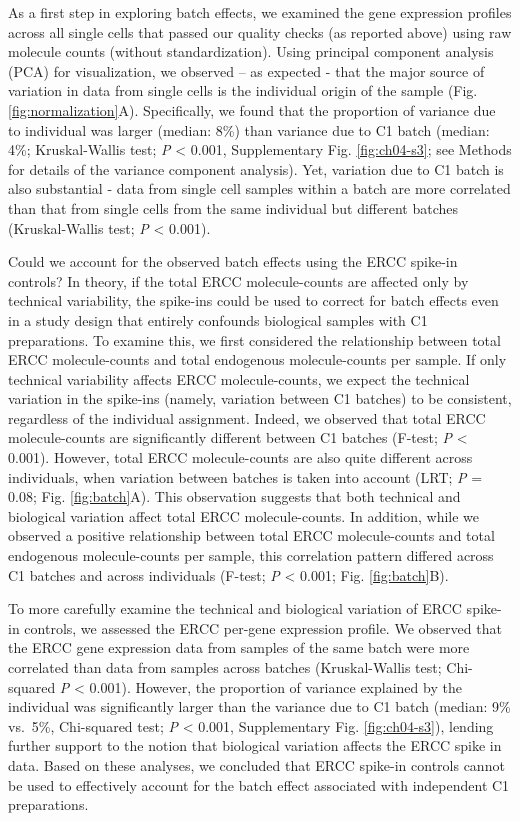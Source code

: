 As a first step in exploring batch effects, we examined the gene
expression profiles across all single cells that passed our quality
checks (as reported above) using raw molecule counts (without
standardization). Using principal component analysis (PCA) for
visualization, we observed -- as expected - that the major source of
variation in data from single cells is the individual origin of the
sample (Fig. \ref{fig:normalization}A). Specifically, we found that
the proportion of variance due to individual was larger (median: 8\%)
than variance due to C1 batch (median: 4\%; Kruskal-Wallis test;
\emph{P} \textless{} 0.001, Supplementary Fig. \ref{fig:ch04-s3}; see
Methods for details of the variance component analysis). Yet,
variation due to C1 batch is also substantial - data from single cell
samples within a batch are more correlated than that from single cells
from the same individual but different batches (Kruskal-Wallis test;
\emph{P} \textless{} 0.001).

Could we account for the observed batch effects using the ERCC
spike-in controls? In theory, if the total ERCC molecule-counts are
affected only by technical variability, the spike-ins could be used to
correct for batch effects even in a study design that entirely
confounds biological samples with C1 preparations. To examine this, we
first considered the relationship between total ERCC molecule-counts
and total endogenous molecule-counts per sample. If only technical
variability affects ERCC molecule-counts, we expect the technical
variation in the spike-ins (namely, variation between C1 batches) to
be consistent, regardless of the individual assignment. Indeed, we
observed that total ERCC molecule-counts are significantly different
between C1 batches (F-test; \emph{P} \textless{} 0.001). However,
total ERCC molecule-counts are also quite different across
individuals, when variation between batches is taken into account
(LRT; \emph{P} = 0.08; Fig. \ref{fig:batch}A). This observation
suggests that both technical and biological variation affect total
ERCC molecule-counts. In addition, while we observed a positive
relationship between total ERCC molecule-counts and total endogenous
molecule-counts per sample, this correlation pattern differed across
C1 batches and across individuals (F-test; \emph{P} \textless{} 0.001;
Fig. \ref{fig:batch}B).

To more carefully examine the technical and biological variation of
ERCC spike-in controls, we assessed the ERCC per-gene expression
profile. We observed that the ERCC gene expression data from samples
of the same batch were more correlated than data from samples across
batches (Kruskal-Wallis test; Chi-squared \emph{P} \textless{}
0.001). However, the proportion of variance explained by the
individual was significantly larger than the variance due to C1 batch
(median: 9\% vs.~5\%, Chi-squared test; \emph{P} \textless{} 0.001,
Supplementary Fig. \ref{fig:ch04-s3}), lending further support to the
notion that biological variation affects the ERCC spike in data. Based
on these analyses, we concluded that ERCC spike-in controls cannot be
used to effectively account for the batch effect associated with
independent C1 preparations.

